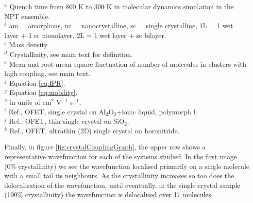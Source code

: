 $^a$ Quench time from 800 K to 300 K in molecular dynamics simulation in the NPT ensemble. \\
$^b$ am = amorphous, nc = nanocrystalline, sc = single crystalline, 1L = 1 wet layer + 1 sc monolayer, 2L = 1 wet layer + sc bilayer. \\
$^c$ Mass density. \\
$^d$ Crystallinity, see main text for definition. \\
$^e$ Mean and root-mean-square fluctuation of number of molecules in clusters with high coupling, see main text. \\
$^f$ Equation \eqref{eq:IPR}.  \\
$^g$ Equation \eqref{eq:mobility}. \\
$^h$ in units of cm$^2$ V$^{-1}$ s$^{-1}$. \\
$^i$ Ref.\cite{Takeyama2012_PentCryst}, OFET, single crystal on Al$_2$O$_3$+ionic liquid, polymorph I. \\
$^j$ Ref.\cite{Arabi2016}, OFET, thin single crystal on SiO$_2$. \\
$^k$ Ref.\cite{Zhang2016TF}, OFET, ultrathin (2D) single crystal on boronitride.

Finally, in figure \ref{fig:crystalCouplingGraph}, the upper row shows a representative wavefunction for each of the systems studied. In the first image (0\% crystallinity) we see the wavefunction localised primarily on a single molecule with a small tail its neighbours. As the crystallinity increases so too does the delocalisation of the wavefunction, until eventually, in the single crystal sample (100\% crystallinity) the wavefunction is delocalised over 17 molecules.

